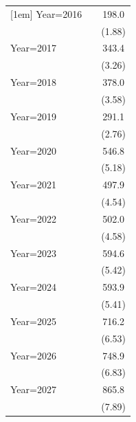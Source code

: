 \documentclass{article}
\begin{document}
{\begin{longtable}{l*{2}{c}}
[1em]
Year=2016           &                     &       198.0         \\
                    &                     &      (1.88)         \\
[1em]
Year=2017           &                     &       343.4\sym{**} \\
                    &                     &      (3.26)         \\
[1em]
Year=2018           &                     &       378.0\sym{***}\\
                    &                     &      (3.58)         \\
[1em]
Year=2019           &                     &       291.1\sym{**} \\
                    &                     &      (2.76)         \\
[1em]
Year=2020           &                     &       546.8\sym{***}\\
                    &                     &      (5.18)         \\
[1em]
Year=2021           &                     &       497.9\sym{***}\\
                    &                     &      (4.54)         \\
[1em]
Year=2022           &                     &       502.0\sym{***}\\
                    &                     &      (4.58)         \\
[1em]
Year=2023           &                     &       594.6\sym{***}\\
                    &                     &      (5.42)         \\
[1em]
Year=2024           &                     &       593.9\sym{***}\\
                    &                     &      (5.41)         \\
[1em]
Year=2025           &                     &       716.2\sym{***}\\
                    &                     &      (6.53)         \\
[1em]
Year=2026           &                     &       748.9\sym{***}\\
                    &                     &      (6.83)         \\
[1em]
Year=2027           &                     &       865.8\sym{***}\\
                    &                     &      (7.89)         \\

\end{longtable}}
\end{document}
